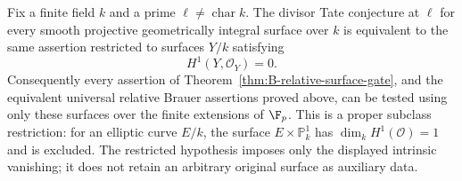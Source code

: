 \begin{theorem}
\label{thm:B-irregularity-zero-surface-gate}
Fix a finite field \(k\) and a prime \(\ell\ne\operatorname{char}k\).
The divisor Tate conjecture at \(\ell\) for every smooth projective
geometrically integral surface over \(k\) is equivalent to the same
assertion restricted to surfaces \(Y/k\) satisfying
\[
                         H^1(Y,\mathcal O_Y)=0.
\]
Consequently every assertion of
Theorem~\ref{thm:B-relative-surface-gate}, and the equivalent universal
relative Brauer assertions proved above, can be tested using only
these surfaces over the finite extensions of \(\F_p\).
This is a proper subclass restriction: for an elliptic curve \(E/k\),
the surface \(E\times\mathbb P^1_k\) has
\(\dim_kH^1(\mathcal O)=1\) and is excluded.  The restricted hypothesis
imposes only the displayed intrinsic vanishing; it does not retain
an arbitrary original surface as auxiliary data.
\end{theorem}

